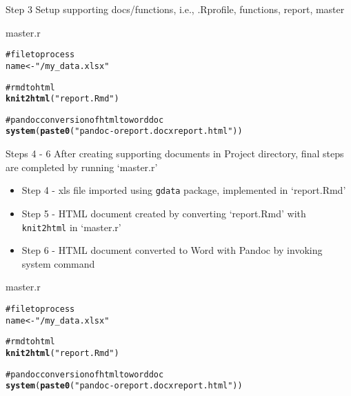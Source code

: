 \documentclass[xcolor=svgnames]{beamer}\usepackage{graphicx, color}
\makeatletter
\newcommand{\hlfunctioncall}[1]{\textcolor[rgb]{0.501960784313725,0,0.329411764705882}{\textbf{#1}}}%
\newcommand{\hlstring}[1]{\textcolor[rgb]{0.6,0.6,1}{#1}}%
\newcommand{\hlcomment}[1]{\textcolor[rgb]{0.180392156862745,0.6,0.341176470588235}{#1}}%
\newenvironment{kframe}{%
 \def\at@end@of@kframe{}%
 \ifinner\ifhmode%
  \def\at@end@of@kframe{\end{minipage}}%
  \begin{minipage}{\columnwidth}%
 \fi\fi%
 \def\FrameCommand##1{\hskip\@totalleftmargin \hskip-\fboxsep
 \colorbox{shadecolor}{##1}\hskip-\fboxsep
     \hskip-\linewidth \hskip-\@totalleftmargin \hskip\columnwidth}%
 \MakeFramed {\advance\hsize-\width
   \@totalleftmargin\z@ \linewidth\hsize
   \@setminipage}}%
 {\par\unskip\endMakeFramed%
 \at@end@of@kframe}
\newenvironment{knitrout}{}{} %
\makeatother
\begin{document}
\begin{frame}[t, fragile]{Step 3}
Setup supporting docs/functions, i.e., .Rprofile, functions, report, master
\scriptsize
\begin{block}{master.r}
\begin{knitrout}
\color{fgcolor}\begin{kframe}
\begin{alltt}
\hlcomment{# file to process}
name <- \hlstring{"/my_data.xlsx"}

\hlcomment{# rmd to html}
\hlfunctioncall{knit2html}(\hlstring{"report.Rmd"})

\hlcomment{# pandoc conversion of html to word doc}
\hlfunctioncall{system}(\hlfunctioncall{paste0}(\hlstring{"pandoc -o report.docx report.html"}))
\end{alltt}
\end{kframe}
\end{knitrout}

\end{block}
\end{frame}

\begin{frame}[fragile]{Steps 4 - 6}
\small
After creating supporting documents in Project directory, final steps are completed by running `master.r'
\begin{itemize}
\item Step 4 - xls file imported using \texttt{gdata} package, implemented in `report.Rmd'
\item Step 5 - HTML document created by converting `report.Rmd' with \texttt{knit2html} in `master.r'
\item Step 6 - HTML document converted to Word with Pandoc by invoking system command
\end{itemize}
\begin{block}{master.r}
\begin{knitrout}
\color{fgcolor}\begin{kframe}
\begin{alltt}
\hlcomment{# file to process}
name <- \hlstring{"/my_data.xlsx"}

\hlcomment{# rmd to html}
\hlfunctioncall{knit2html}(\hlstring{"report.Rmd"})

\hlcomment{# pandoc conversion of html to word doc}
\hlfunctioncall{system}(\hlfunctioncall{paste0}(\hlstring{"pandoc -o report.docx report.html"}))
\end{alltt}
\end{kframe}
\end{knitrout}

\end{block}
\end{frame}
\end{document}
